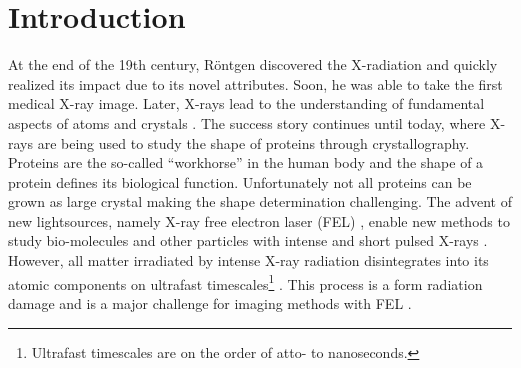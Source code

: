 \chapter{Introduction}
At the end of the 19th century, R\"ontgen discovered the X-radiation \citep{Roentgen-NP} and quickly realized its impact due to its novel attributes. Soon, he was able to take the first medical X-ray image. Later, X-rays lead to the understanding of fundamental aspects of atoms \citep{Siegbahn-NP} and crystals \citep{Laue-NP,Bragg-NP}. The success story continues until today, where X-rays are being used to study the shape of proteins through crystallography. Proteins are the so-called ``workhorse'' in the human body and the shape of a protein defines its biological function. Unfortunately not all proteins can be grown as large crystal making the shape determination challenging. The advent of new lightsources, namely X-ray free electron laser (FEL) \citep{Ackermann-2007-NPho}, enable new methods to study bio-molecules and other particles with intense and short pulsed X-rays \citep{Chapman-2006-NatPhys,Chapman-2011-Nature}. However, all matter irradiated by intense X-ray radiation disintegrates into its atomic components on ultrafast timescales\footnote{Ultrafast timescales are on the order of atto- to nanoseconds.} \citep{Neutze-2000-Nature}. This process is a form radiation damage and is a major challenge for imaging methods with FEL \citep{Aquila-2015-StrucDyn}.\\
